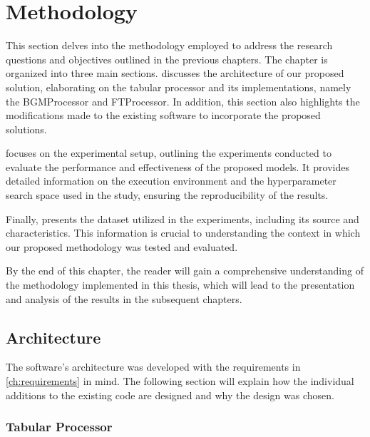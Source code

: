 \chapter{Methodology}
\label{ch:methodology}

This section delves into the methodology employed to address the research questions and objectives outlined in the previous chapters.
The chapter is organized into three main sections.
 discusses the architecture of our proposed solution, elaborating on the tabular processor and its implementations, namely the BGMProcessor and FTProcessor.
In addition, this section also highlights the modifications made to the existing software to incorporate the proposed solutions.

 focuses on the experimental setup, outlining the experiments conducted to evaluate the performance and effectiveness of the proposed models.
It provides detailed information on the execution environment and the hyperparameter search space used in the study, ensuring the reproducibility of the results.

Finally,  presents the dataset utilized in the experiments, including its source and characteristics.
This information is crucial to understanding the context in which our proposed methodology was tested and evaluated.

By the end of this chapter, the reader will gain a comprehensive understanding of the methodology implemented in this thesis, which will lead to the presentation and analysis of the results in the subsequent chapters.

\section{Architecture}
\label{ch:architecture}

The software's architecture was developed with the requirements in \autoref{ch:requirements} in mind.
The following section will explain how the individual additions to the existing code are designed and why the design was chosen.


\subsection{Tabular Processor}
\label{ch:architecture-tabularProcessor}


